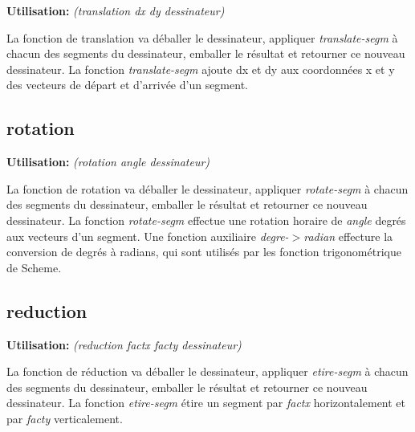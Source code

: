 \documentclass[10pt]{report}
\newcommand{\usage}[1]{\textbf{Utilisation: }\emph{#1}}
\begin{document}
\usage{(translation dx dy dessinateur)}

La fonction de translation va déballer le dessinateur, appliquer
\emph{translate-segm} à chacun des segments du dessinateur, emballer
le résultat et retourner ce nouveau dessinateur.  La fonction
\emph{translate-segm} ajoute dx et dy aux coordonnées x et y des
vecteurs de départ et d'arrivée d'un segment.


\subsection{rotation}

\usage{(rotation angle dessinateur)}

La fonction de rotation va déballer le dessinateur, appliquer
\emph{rotate-segm} à chacun des segments du dessinateur, emballer le
résultat et retourner ce nouveau dessinateur.  La fonction
\emph{rotate-segm} effectue une rotation horaire de \emph{angle}
degrés aux vecteurs d'un segment.  Une fonction auxiliaire
\emph{degre-$>$radian} effecture la conversion de degrés à radians,
qui sont utilisés par les fonction trigonométrique de Scheme.

\subsection{reduction}

\usage{(reduction factx facty dessinateur)}

La fonction de réduction va déballer le dessinateur, appliquer
\emph{etire-segm} à chacun des segments du dessinateur, emballer le
résultat et retourner ce nouveau dessinateur.  La fonction
\emph{etire-segm} étire un segment par \emph{factx} horizontalement et
par \emph{facty} verticalement.
\end{document}
